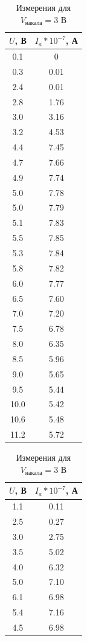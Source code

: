 \documentclass[12pt]{article}
\begin{document}
\begin{table}[h!]
\parbox{.5\linewidth}{
\centering
\begin{tabular}{|c|c|}
	\hline
		$U$, В & $I_a * 10^{-7}$, А \\
	\hline
		0.1	& 0 \\
	\hline
0.3	&0.01 \\
\hline
2.4	&0.01 \\
\hline
2.8	&1.76 \\
\hline
3.0	&3.16 \\
\hline
3.2	&4.53 \\
\hline
4.4	&7.45 \\
\hline
4.7	&7.66 \\
\hline
4.9	&7.74 \\
\hline
5.0	&7.78 \\
\hline
5.0	&7.79 \\
\hline
5.1	&7.83 \\
\hline
5.5	&7.85 \\
\hline
5.3	&7.84 \\
\hline
5.8	&7.82 \\
\hline
6.0	&7.77 \\
\hline
6.5	&7.60 \\
\hline
7.0	&7.20 \\
\hline
7.5	&6.78 \\
\hline
8.0	&6.35 \\
\hline
8.5	&5.96 \\
\hline
9.0	&5.65 \\
\hline
9.5	&5.44 \\
\hline
10.0&	5.42 \\
\hline
10.6&	5.48 \\
\hline
11.2&	5.72 \\
	\hline
	\end{tabular}
	\caption{Измерения для $V_\text{накала} = 3$ В}
}
\hfill
\parbox{.5\linewidth}{
\centering
\begin{tabular}{|c|c|}
	\hline
		$U$, В & $I_a * 10^{-7}$, А \\
\hline
	1.1&	0.11 \\
\hline
2.5	&0.27 \\
\hline
3.0	&2.75 \\
\hline
3.5	&5.02 \\
\hline
4.0&	6.32 \\
\hline
5.0	&7.10 \\
\hline
6.1	&6.98 \\
\hline
5.4	&7.16 \\
\hline
4.5	&6.98 \\

\end{tabular}}
\end{table}
\end{document}
